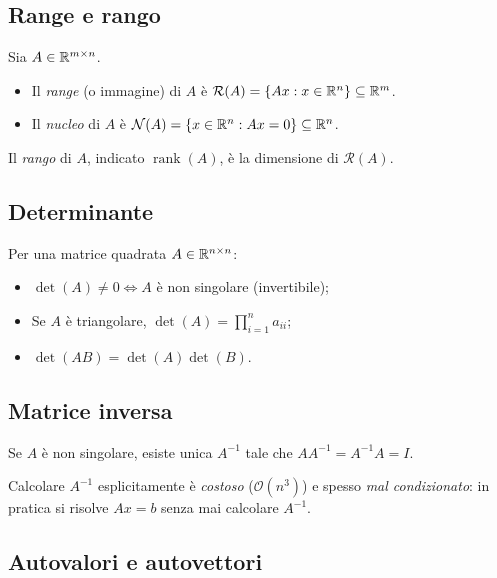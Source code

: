 \subsection{Range e rango}

\begin{definition}
Sia $A \in \mathbb{R}^{m \times n}$.
\begin{itemize}
  \item Il \emph{range} (o immagine) di $A$ è $\mathcal{R}(A) = \{Ax : x \in \mathbb{R}^n\} \subseteq \mathbb{R}^m$.
  \item Il \emph{nucleo} di $A$ è $\mathcal{N}(A) = \{x \in \mathbb{R}^n : Ax = 0\} \subseteq \mathbb{R}^n$.
\end{itemize}
\end{definition}

\begin{definition}[Rango]
Il \emph{rango} di $A$, indicato $\operatorname{rank}(A)$, è la dimensione di
$\mathcal{R}(A)$.
\end{definition}

\subsection{Determinante}

Per una matrice quadrata $A \in \mathbb{R}^{n \times n}$:
\begin{itemize}
  \item $\det(A) \neq 0 \iff A$ è non singolare (invertibile);
  \item Se $A$ è triangolare, $\det(A) = \prod_{i=1}^n a_{ii}$;
  \item $\det(AB) = \det(A)\det(B)$.
\end{itemize}

\subsection{Matrice inversa}

Se $A$ è non singolare, esiste unica $A^{-1}$ tale che $AA^{-1} = A^{-1}A = I$.

\begin{remark}
Calcolare $A^{-1}$ esplicitamente è \emph{costoso} ($\mathcal{O}(n^3)$) e spesso
\emph{mal condizionato}: in pratica si risolve $Ax = b$ senza mai calcolare $A^{-1}$.
\end{remark}

\subsection{Autovalori e autovettori}

